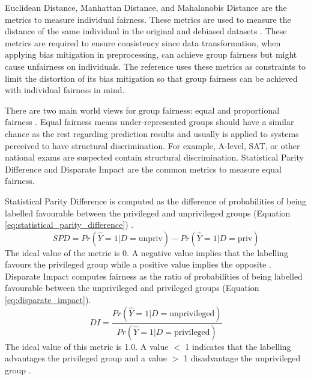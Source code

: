 \documentclass[sigconf,review]{acmart}
\begin{document}
Euclidean Distance, Manhattan Distance, and Mahalanobis Distance are the metrics to measure individual fairness. These metrics are used to measure the distance of the same individual in the original and debiased datasets \cite{bellamy2018ai}. These metrics are required to ensure consistency since data transformation, when applying bias mitigation in preprocessing, can achieve group fairness but might cause unfairness on individuals. The reference \cite{calmon2017optimized} uses these metrics as constraints to limit the distortion of its bias mitigation so that group fairness can be achieved with individual fairness in mind. 

There are two main world views for group fairness: equal and proportional fairness \cite{mahoney2020ai,ibmaif3602022guidance}. Equal fairness means under-represented groups should have a similar chance as the rest regarding prediction results and usually is applied to systems perceived to have structural discrimination. For example, A-level, SAT, or other national exams are suspected contain structural discrimination. Statistical Parity Difference \cite{dwork2012fairness,mahoney2020ai,ibmaif3602022guidance} and Disparate Impact \cite{feldman2015disparate,mahoney2020ai,ibmaif3602022guidance} are the common metrics to measure equal fairness. 

Statistical Parity Difference is computed as the difference of probabilities of being labelled favourable between the privileged and unprivileged groups (Equation \ref{eq:statistical_parity_difference}) \cite{dwork2012fairness,ibmaif3602022doc,bellamy2018ai}. 
\begin{equation} \label{eq:statistical_parity_difference}
	SPD = Pr(\hat{Y} = 1 | D = \text{unpriv})
	- Pr(\hat{Y} = 1 | D = \text{priv})
\end{equation}
The ideal value of the metric is 0. A negative value implies that the labelling favours the privileged group while a positive value implies the opposite \cite{ibmaif3602022doc,bellamy2018ai}. Disparate Impact \cite{feldman2015disparate,ibmaif3602022doc,bellamy2018ai} computes fairness as the ratio of probabilities of being labelled favourable between the unprivileged and privileged groups (Equation \ref{eq:disparate_impact}).
\begin{equation} \label{eq:disparate_impact}
	DI = \frac{Pr(\hat{Y} = 1 | D = \text{unprivileged})}
	{Pr(\hat{Y} = 1 | D = \text{privileged})}
\end{equation}
The ideal value of this metric is 1.0. A value $<$ 1 indicates that the labelling advantages the privileged group and a value $>$ 1 disadvantage the unprivileged group \cite{ibmaif3602022doc,bellamy2018ai}.
\end{document}

